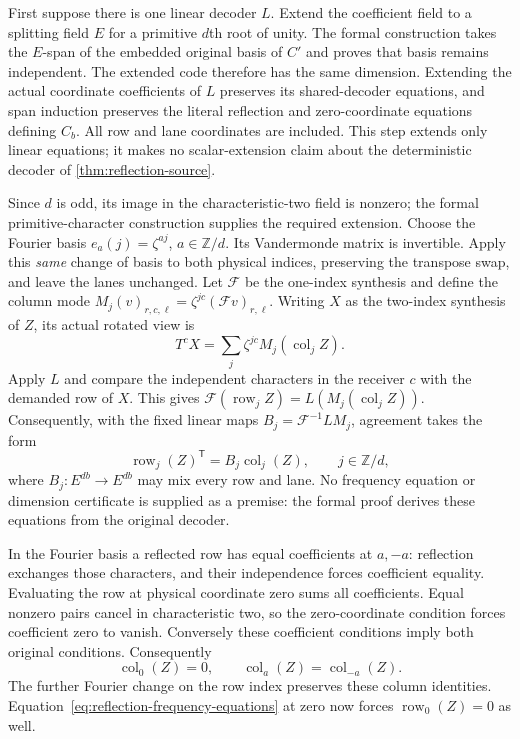 \begin{outline}
First suppose there is one linear decoder $L$. Extend the coefficient
field to a splitting field $E$ for a primitive $d$th root of unity.
The formal construction takes the $E$-span of the embedded original basis
of $C'$ and proves that basis remains independent. The extended code
therefore has the same dimension. Extending the actual coordinate
coefficients of $L$ preserves its shared-decoder equations, and span
induction preserves the literal reflection and zero-coordinate equations
defining $C_b$. All row and lane coordinates are included. This step
extends only linear equations;
it makes no scalar-extension claim about the deterministic decoder of
\cref{thm:reflection-source}.

Since $d$ is odd, its image in the characteristic-two field is nonzero;
the formal primitive-character construction supplies the required
extension. Choose the Fourier basis $e_a(j)=\zeta^{aj}$,
$a\in\mathbb Z/d$. Its Vandermonde matrix is invertible. Apply this
\emph{same} change of basis to both physical indices, preserving the
transpose swap, and leave the lanes unchanged. Let $\mathcal F$ be the
one-index synthesis and define the column mode
$M_j(v)_{r,c,\ell}=\zeta^{jc}(\mathcal Fv)_{r,\ell}$.
Writing $X$ as the two-index synthesis of $Z$, its actual rotated view is
\[
 T^cX=\sum_j\zeta^{jc}M_j(\operatorname{col}_jZ).
\]
Apply $L$ and compare the independent characters in the receiver $c$
with the demanded row of $X$. This gives
$\mathcal F(\operatorname{row}_jZ)=L(M_j(\operatorname{col}_jZ))$.
Consequently, with the fixed linear maps
$B_j=\mathcal F^{-1}LM_j$, agreement takes the form
\begin{equation}\label{eq:reflection-frequency-equations}
 \operatorname{row}_j(Z)^{\mathsf T}
       =B_j\operatorname{col}_j(Z),\qquad j\in\mathbb Z/d,
\end{equation}
where $B_j:E^{db}\to E^{db}$ may mix every row and lane. No frequency
equation or dimension certificate is supplied as a premise: the formal
proof derives these equations from the original decoder.

In the Fourier basis a reflected row has equal coefficients at $a,-a$:
reflection exchanges those characters, and their independence forces
coefficient equality. Evaluating the row at physical coordinate zero sums
all coefficients. Equal nonzero pairs cancel in characteristic two, so
the zero-coordinate condition forces coefficient zero to vanish.
Conversely these coefficient conditions imply both original conditions.
Consequently
\[
 \operatorname{col}_0(Z)=0,\qquad
 \operatorname{col}_a(Z)=\operatorname{col}_{-a}(Z).
\]
The further Fourier change on the row index preserves these column
identities. Equation~\eqref{eq:reflection-frequency-equations} at zero now
forces $\operatorname{row}_0(Z)=0$ as well.


\end{outline}
